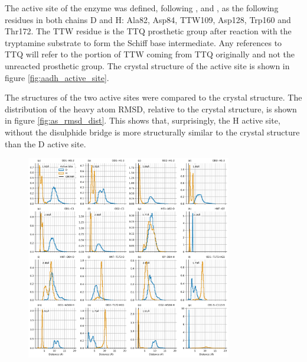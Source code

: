 The active site of the enzyme was defined, following \cite{ranaghanInitioQMMM2017}, \cite{masgrauAtomicDescriptionEnzyme2006} and \cite{masgrauTunnelingClassicalPaths2007},  as the following residues in both chains D and H: Ala82, Asp84, TTW109, Asp128, Trp160 and Thr172. The TTW residue is the TTQ prosthetic group after reaction with the tryptamine substrate to form the Schiff base intermediate. Any references to TTQ will refer to the portion of TTW coming from TTQ originally and not the unreacted prosthetic group. The crystal structure of the active site is shown in figure \ref{fig:aadh_active_site}. 

The structures of the two active sites were compared to the crystal structure. The distribution of the heavy atom RMSD, relative to the crystal structure, is shown in figure \ref{fig:as_rmsd_dist}. This shows that, surprisingly, the H active site, without the disulphide bridge is more structurally similar to the crystal structure than the D active site. 

\begin{figure}
    \centering
    \includegraphics[width=0.8\textwidth]{chapters/aadh/figures/bond_distances_dist.png}
    \label{fig:bond_dist}
\end{figure}

